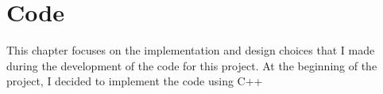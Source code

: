 \chapter{Code}
This chapter focuses on the implementation and design choices that I made during the development of the code for this project.
At the beginning of the project, I decided to implement the code using C++
